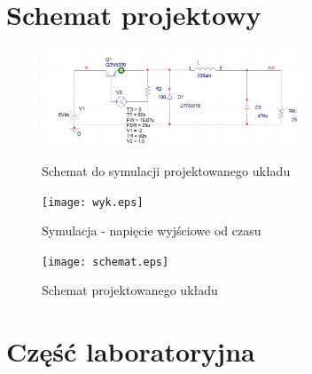 \documentclass[a4paper,12pt]{article}
\begin{document}
\section {Schemat projektowy}
\begin{figure}[h]
  \center
  \includegraphics[width=0.7\textwidth]{schemat_sim.eps}

  \caption{Schemat do symulacji projektowanego układu}

  \center
  \texttt{[image: wyk.eps]}
  \caption{Symulacja - napięcie wyjściowe od czasu}

  \center
  \texttt{[image: schemat.eps]}
  \caption{Schemat projektowanego układu}
\end{figure}

\pagebreak
\section{Część laboratoryjna}
\end{document}
